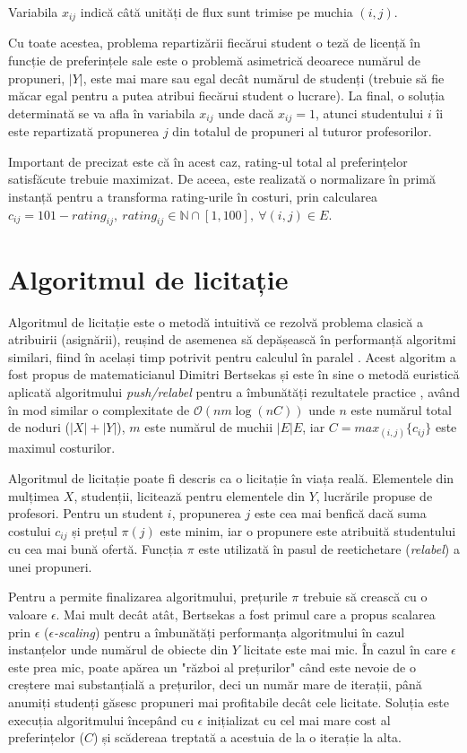 Variabila $x_{ij}$ indică câtă unități de flux sunt trimise pe muchia $(i, j)$.

Cu toate acestea, problema repartizării fiecărui student o teză de licență în funcție de preferințele sale este o problemă asimetrică deoarece numărul de propuneri, $|Y|$, este mai mare sau egal decât numărul de studenți (trebuie să fie măcar egal pentru a putea atribui fiecărui student o lucrare). La final, o soluția determinată se va afla în variabila $x_{ij}$ unde dacă $x_{ij} = 1$, atunci studentului $i$ îi este repartizată propunerea $j$ din totalul de propuneri al tuturor profesorilor.

Important de precizat este că în acest caz, rating-ul total al preferințelor satisfăcute trebuie maximizat. De aceea, este realizată o normalizare în primă instanță pentru a transforma rating-urile în costuri, prin calcularea $c_{ij} = 101 - rating_{ij},\: rating_{ij} \in \mathbb{N} \cap [1, 100],\: \forall (i, j) \in E$.

\section{Algoritmul de licitație}

Algoritmul de licitație este o metodă intuitivă ce rezolvă problema clasică a atribuirii (asignării), reușind de asemenea să depășească în performanță algoritmi similari, fiind în același timp potrivit pentru calculul în paralel \cite[p.~1]{auction}. Acest algoritm a fost propus de matematicianul Dimitri Bertsekas și este în sine o metodă euristică aplicată algoritmului \textit{push/relabel} pentru a îmbunătăți rezultatele practice \cite[p.~24]{assignment}, având în mod similar o complexitate de $\mathcal{O}(n m \log(n C))$ unde $n$ este numărul total de noduri ($|X|+|Y|$), $m$ este numărul de muchii $|E|E$, iar $C = max_{(i, j)}\{c_{ij}\}$ este maximul costurilor. 

Algoritmul de licitație poate fi descris ca o licitație în viața reală. Elementele din mulțimea $X$, studenții, licitează pentru elementele din $Y$, lucrările propuse de profesori. Pentru un student $i$, propunerea $j$ este cea mai benfică dacă suma costului $c_{ij}$ și prețul $\pi(j)$ este minim, iar o propunere este atribuită studentului cu cea mai bună ofertă\cite{assignment}. Funcția $\pi$ este utilizată în pasul de reetichetare (\textit{relabel}) a unei propuneri.

Pentru a permite finalizarea algoritmului, prețurile $\pi$ trebuie să crească cu o valoare $\epsilon$. Mai mult decât atât, Bertsekas a fost primul care a propus scalarea prin $\epsilon$ (\textit{$\epsilon$-scaling}) pentru a îmbunătăți performanța algoritmului în cazul instanțelor unde numărul de obiecte din $Y$ licitate este mai mic. În cazul în care $\epsilon$ este prea mic, poate apărea un "război al prețurilor" când este nevoie de o creștere mai substanțială a prețurilor, deci un număr mare de iterații, până anumiți studenți găsesc propuneri mai profitabile decât cele licitate. Soluția este execuția algoritmului începând cu $\epsilon$ inițializat cu cel mai mare cost al preferințelor ($C$) și scădereaa treptată a acestuia de la o iterație la alta.

